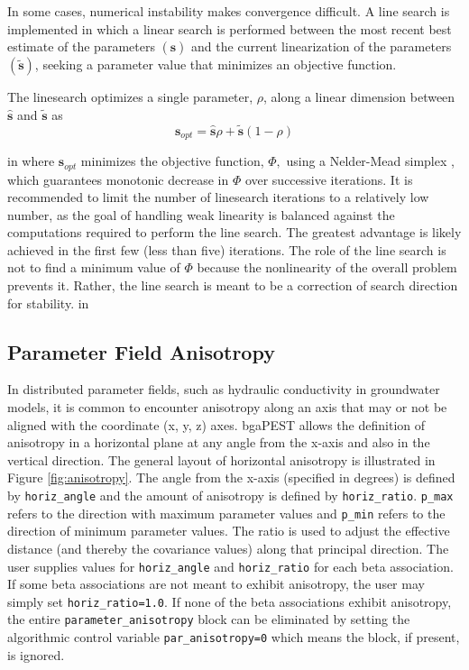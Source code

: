 \documentclass[11pt,oneside,onecolumn]{usgsreport}
\begin{document}
\begin{appendix}
In some cases, numerical instability makes convergence difficult.
A line search is implemented in which a linear search is performed
between the most recent best estimate of the parameters $\left(\mathbf{\hat{s}}\right)$
and the current linearization of the parameters $\left(\mathbf{\widetilde{\mathbf{s}}}\right)$,
seeking a parameter value that minimizes an objective function. 

The linesearch optimizes a single parameter, $\rho$, along a linear
dimension between $\mathbf{\hat{s}}$ and $\mathbf{\widetilde{\mathbf{s}}}$
as
\[
\mathbf{s}_{opt}=\mathbf{\mathbf{\hat{s}}}\rho+\mathbf{\widetilde{\mathbf{s}}}\left(1-\rho\right)
\]

 in
where $\mathbf{s}_{opt}$ minimizes the objective function, $\Phi,$
using a Nelder-Mead simplex \citep[see, e.g., ][]{Press1992}, which
guarantees monotonic decrease in $\Phi$ over successive
iterations. It is recommended to limit the number of linesearch iterations
to a relatively low number, as the goal of handling weak linearity
is balanced against the computations required to perform the line
search. The greatest advantage is likely achieved in the first few
(less than five) iterations. The role of the line search is not to
find a minimum value of $\Phi$ because the nonlinearity
of the overall problem prevents it. Rather, the line search is meant
to be a correction of search direction for stability.
 in

\subsection{Parameter Field Anisotropy\label{sub:anisotropy}}

In distributed parameter fields, such as hydraulic conductivity in
groundwater models, it is common to encounter anisotropy along an
axis that may or not be aligned with the coordinate (x, y, z) axes.
bgaPEST allows the definition of anisotropy in a horizontal plane
at any angle from the x-axis and also in the vertical direction. The
general layout of horizontal anisotropy is illustrated in Figure \ref{fig:anisotropy}.
The angle from the x-axis (specified in degrees) is defined by \texttt{horiz\_angle}
and the amount of anisotropy is defined by \texttt{horiz\_ratio}.
\texttt{p\_max} refers to the direction with maximum parameter values
and \texttt{p\_min} refers to the direction of minimum parameter
values. The ratio is used to adjust the effective distance (and thereby
the covariance values) along that principal direction. The user supplies
values for \texttt{horiz\_angle} and \texttt{horiz\_ratio} for each
beta association. If some beta associations are not meant to exhibit
anisotropy, the user may simply set \texttt{horiz\_ratio=1.0}. If
none of the beta associations exhibit anisotropy, the entire \texttt{parameter\_anisotropy}
block can be eliminated by setting the algorithmic control variable
\texttt{par\_anisotropy=0} which means the block, if present, is
ignored.


\end{appendix}
\end{document}
